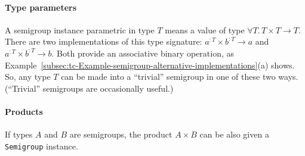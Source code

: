 \paragraph{Type parameters}

A semigroup instance parametric in type $T$ means a value of type
$\forall T.\,T\times T\rightarrow T$. There are two implementations
of this type signature: $a^{:T}\times b^{:T}\rightarrow a$ and $a^{:T}\times b^{:T}\rightarrow b$.
Both provide an associative binary operation, as Example~\ref{subsec:tc-Example-semigroup-alternative-implementations}(a)
shows. So, any type $T$ can be made into a ``trivial'' semigroup
in one of these two ways. (``Trivial''
semigroups are occasionally useful.)

\paragraph{Products}

If types $A$ and $B$ are semigroups, the product $A\times B$ can
be also given a \lstinline!Semigroup! instance. 

